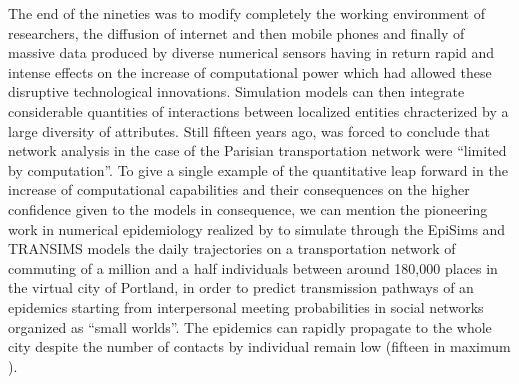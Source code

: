 \documentclass[10pt]{article}
\begin{document}
The end of the nineties was to modify completely the working environment of researchers, the diffusion of internet and then mobile phones and finally of massive data produced by diverse numerical sensors having in return rapid and intense effects on the increase of computational power which had allowed these disruptive technological innovations. Simulation models can then integrate considerable quantities of interactions between localized entities chracterized by a large diversity of attributes. Still fifteen years ago, \cite{gleyze2005vulnerabilite} was forced to conclude that network analysis in the case of the Parisian transportation network were ``limited by computation''. To give a single example of the quantitative leap forward in the increase of computational capabilities and their consequences on the higher confidence given to the models in consequence, we can mention the pioneering work in numerical epidemiology realized by \cite{eubank2004modelling} to simulate through the EpiSims and TRANSIMS models the daily trajectories on a transportation network of commuting of a million and a half individuals between around 180,000 places in the virtual city of Portland, in order to predict transmission pathways of an epidemics starting from interpersonal meeting probabilities in social networks organized as ``small worlds''. The epidemics can rapidly propagate to the whole city despite the number of contacts by individual remain low (fifteen in maximum \citep{eliot2006diffusion}).
\end{document}
